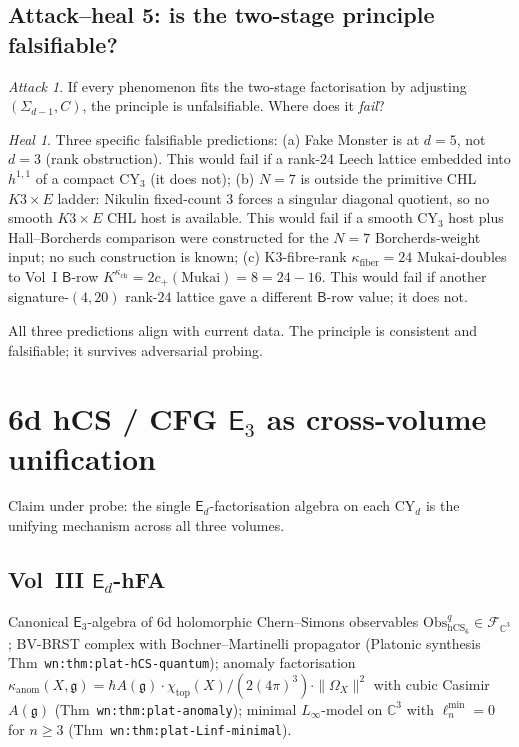 \documentclass[11pt]{article}
\theoremstyle{definition}
\theoremstyle{remark}
\newtheorem{attack}[theorem]{Attack}
\newtheorem{heal}[theorem]{Heal}
\providecommand{\C}{\mathbb{C}}
\providecommand{\cF}{\mathcal{F}}
\providecommand{\fg}{\mathfrak{g}}
\providecommand{\Obs}{\mathrm{Obs}}
\providecommand{\hCS}{\mathrm{hCS}}
\providecommand{\Ethree}{\mathsf{E}_3}
\providecommand{\Ed}{\mathsf{E}_d}
\providecommand{\kch}{\kappa_{\mathrm{ch}}}
\providecommand{\kfib}{\kappa_{\mathrm{fiber}}}
\providecommand{\kan}{\kappa_{\mathrm{anom}}}
\begin{document}
\subsection{Attack--heal 5: is the two-stage principle falsifiable?}

\begin{attack}
If every phenomenon fits the two-stage factorisation by adjusting
$(\Sigma_{d-1},C)$, the principle is unfalsifiable. Where does it
\emph{fail}?
\end{attack}

\begin{heal}
Three specific falsifiable predictions:
(a) Fake Monster is at $d = 5$, not $d = 3$ (rank obstruction).
This would fail if a rank-$24$ Leech lattice embedded into
$h^{1,1}$ of a compact CY$_3$ (it does not);
(b) $N = 7$ is outside the primitive CHL $K3\times E$ ladder:
Nikulin fixed-count $3$ forces a singular diagonal quotient, so no
smooth $K3\times E$ CHL host is available. This would fail if a smooth
CY$_3$ host plus Hall--Borcherds comparison were constructed for the
$N=7$ Borcherds-weight input; no such construction is known;
(c) K3-fibre-rank $\kfib = 24$ Mukai-doubles to Vol~I $\mathsf{B}$-row
$K^{\kch} = 2c_+(\mathrm{Mukai}) = 8 = 24 - 16$. This would fail if
another signature-$(4, 20)$ rank-$24$ lattice gave a different
$\mathsf{B}$-row value; it does not.

All three predictions align with current data. The principle is
consistent and falsifiable; it survives adversarial probing.
\end{heal}

\section{6d hCS / CFG $\Ethree$ as cross-volume unification}

Claim under probe: the single $\Ed$-factorisation algebra on each CY$_d$
is the unifying mechanism across all three volumes.

\subsection{Vol~III $\Ed$-hFA}

Canonical $\Ethree$-algebra of 6d holomorphic Chern--Simons observables
$\Obs^q_{\hCS_6}\in\cF_{\C^3}$; BV-BRST complex with
Bochner--Martinelli propagator (Platonic synthesis
Thm~\texttt{wn:thm:plat-hCS-quantum}); anomaly factorisation
$\kan(X, \fg) = \hbar A(\fg)\cdot\chi_{\mathrm{top}}(X)/(2(4\pi)^3)
\cdot\|\Omega_X\|^2$ with cubic Casimir $A(\fg)$
(Thm~\texttt{wn:thm:plat-anomaly}); minimal $L_\infty$-model on $\C^3$
with $\ell_n^{\min} = 0$ for $n\geq 3$
(Thm~\texttt{wn:thm:plat-Linf-minimal}).
\end{document}
